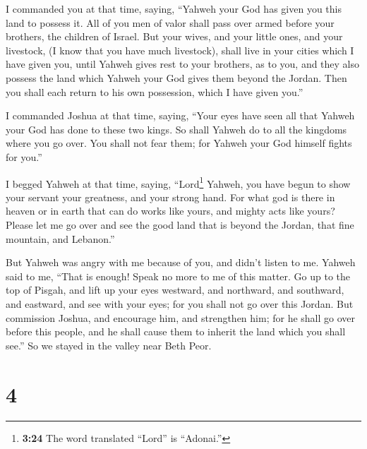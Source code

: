  I commanded you at that time, saying, ``Yahweh your God
has given you this land to possess it. All of you men of valor shall
pass over armed before your brothers, the children of Israel.
 But your wives, and your little ones, and your
livestock, (I know that you have much livestock), shall live in your
cities which I have given you,  until Yahweh gives rest
to your brothers, as to you, and they also possess the land which Yahweh
your God gives them beyond the Jordan. Then you shall each return to his
own possession, which I have given you.''

 I commanded Joshua at that time, saying, ``Your eyes
have seen all that Yahweh your God has done to these two kings. So shall
Yahweh do to all the kingdoms where you go over.  You
shall not fear them; for Yahweh your God himself fights for you.''

 I begged Yahweh at that time, saying, 
``Lord\footnote{\textbf{3:24} The word translated ``Lord'' is
  ``Adonai.''} Yahweh, you have begun to show your servant your
greatness, and your strong hand. For what god is there in heaven or in
earth that can do works like yours, and mighty acts like yours?
 Please let me go over and see the good land that is
beyond the Jordan, that fine mountain, and Lebanon.''

 But Yahweh was angry with me because of you, and didn't
listen to me. Yahweh said to me, ``That is enough! Speak no more to me
of this matter.  Go up to the top of Pisgah, and lift up
your eyes westward, and northward, and southward, and eastward, and see
with your eyes; for you shall not go over this Jordan. 
But commission Joshua, and encourage him, and strengthen him; for he
shall go over before this people, and he shall cause them to inherit the
land which you shall see.''  So we stayed in the valley
near Beth Peor.

\hypertarget{section-3}{%
\section{4}\label{section-3}}

